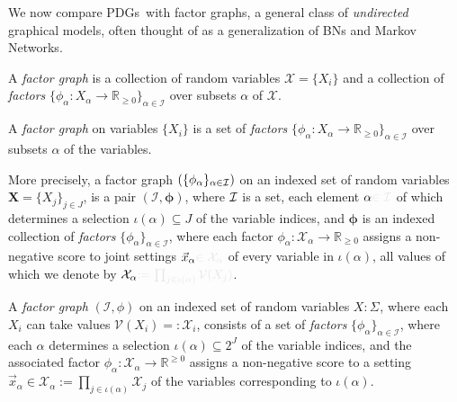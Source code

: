 \documentclass{article}
\newcommand{\notation}[2][]{#1}
\renewcommand{\notation}[2][]{{\color{notationcolor} #2}}
\newcommand{\V}{\mathcal V}
\newcommand{\MN}{PDG}
\newcommand{\MNs}{\MN s}
\numberwithin{equation}{section}
\begin{document}
\begin{notfocus}
	
	We now compare \MNs\ with factor graphs, a general class of \emph{undirected} graphical models, often thought of as a generalization of BNs and Markov Networks.
	
	
\begin{quickdefn}
	A \emph{factor graph} is a collection of random variables $\mathcal X = \{X_i\}$ and a collection of \emph{factors} $\{\phi_\alpha\colon X_\alpha \to \mathbb R_{\geq0}\}_{\alpha \in \mathcal I }$ over subsets $\alpha$ of $\mathcal X$.
\end{quickdefn}
	\begin{defn}
		A \emph{factor graph} on variables $\{X_i\}$ is a set of \emph{factors} $\{\phi_\alpha\colon X_\alpha \to \mathbb R_{\geq0}\}_{\alpha \in \mathcal I }$ over subsets $\alpha$ of the variables.
		
		More precisely, a factor graph $ (\{\phi_\alpha\}_{\alpha \in \cal I})$ on an indexed set of random variables $\mathbf X = \{ X_j \}_{j \in J}$, 
		is a pair $(\mathcal I, \boldsymbol\phi)$, where $\cal I$ is a set,
		each element $\alpha\notation{\in \mathcal I}$ of which determines a selection $\iota(\alpha) \subseteq J$ of the variable indices, and
		$\boldsymbol\phi$ is an indexed collection of \emph{factors} $\{\phi_\alpha\}_{\alpha \in \mathcal I }$, 
		where each factor $\phi_\alpha \colon \mathcal X_\alpha \to \mathbb R_{\geq 0}$ assigns a non-negative score to joint settings $\vec x_\alpha \notation{\in \mathcal X_\alpha}$ of every variable in $\iota(\alpha)$, all values of which we denote by $\mathcal X_\alpha\notation{ := \prod_{j \in \iota(\alpha)} \mathcal V(X_j)}$. 
	\end{defn}
\begin{fulldefn}
	A \emph{factor graph} $(\mathcal I, \phi)$ on an indexed set of random variables $X : \Sigma_{}$, where each $X_i$ can take values $\V(X_i) =: \mathcal X_i$, consists of  
	a set of \emph{factors} $\{\phi_\alpha\}_{\alpha \in \mathcal I }$, where each $\alpha$ determines a selection $\iota(\alpha) \subseteq 2^J$ of the variable indices, and the associated factor $\phi_\alpha \colon \mathcal X_\alpha \to \mathbb R^{\geq 0}$ assigns a non-negative score to a setting $\vec x_\alpha \in \mathcal X_\alpha := \prod_{j \in \iota(\alpha)} \mathcal X_j$ of the variables corresponding to $\iota(\alpha)$.
	

\end{fulldefn}
\end{notfocus}
\end{document}
